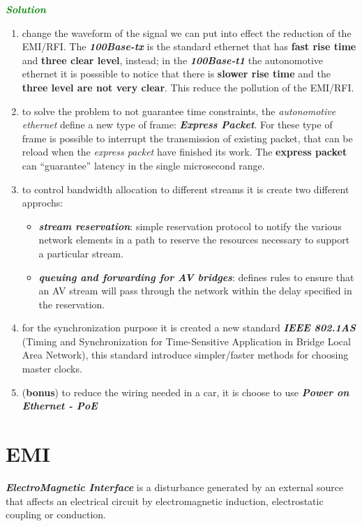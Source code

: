 \begin{boxA}
    \textcolor{green}{\textbf{\textit{Solution}}}
    \begin{enumerate}[nosep]
        \item change the waveform of the signal we can put into effect the reduction of the EMI/RFI. The \textbf{\textit{100Base-tx}} is the standard ethernet that has \textbf{fast rise time} and \textbf{three clear level}, instead; in the \textbf{\textit{100Base-t1}} the autonomotive ethernet it is posssible to notice that there is \textbf{slower rise time} and the \textbf{three level are not very clear}. This reduce the pollution of the EMI/RFI.
        \item to solve the problem to not guarantee time constraints, the \textit{autonomotive ethernet} define a new type of frame: \textbf{\textit{Express Packet}}. For these type of frame is possible to interrupt the transmission of existing packet, that can be reload when the \textit{express packet} have finished its work. The \textbf{express packet} can ``guarantee'' latency in the single microsecond range.
        \item to control bandwidth allocation to different streams it is create two different approchs:
        \begin{itemize}[nosep]
            \item \textbf{\textit{stream reservation}}: simple reservation protocol to notify the various network elements in a path to reserve the resources necessary to support a particular stream.
            \item \textbf{\textit{queuing and forwarding for AV bridges}}: defines rules to ensure that an AV stream will pass through the network within the delay specified in the reservation.
        \end{itemize}
        \item for the synchronization purpose it is created a new standard \textbf{\textit{IEEE 802.1AS}} (Timing and Synchronization for Time-Sensitive Application in Bridge Local Area Network), this standard introduce simpler/faster methods for choosing master clocks.
        \item (\textbf{bonus}) to reduce the wiring needed in a car, it is choose to use \textbf{\textit{Power on Ethernet - PoE}}
    \end{enumerate}
\end{boxA}

\newpage
\section{EMI}
\textbf{\textit{ElectroMagnetic Interface}} is a disturbance generated by an external source that affects an electrical circuit by electromagnetic induction, electrostatic coupling or conduction.

